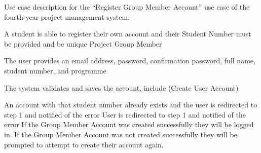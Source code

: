 \documentclass[document.tex]{subfiles}
\begin{document}
\begin{table}
  \centering
  \caption{Use case description for the ``Register Group Member Account'' use case of the fourth-year project management system.}
  \label{tbl:use-case-register-member-account}

  \begin{usecase}
    A student is able to register their own account and their Student Number must be provided and be unique
    Project Group Member
    \ucnormal
    \begin{ucenum}
      \item The user provides an email address, password, confirmation password, full name, student number, and programme
      \item The system validates and saves the account, include (Create User Account)
    \end{ucenum}
    An account with that student number already exists and the user is redirected to step 1 and notified of the error
    User is redirected to step 1 and notified of the error
    If the Group Member Account was created successfully they will be logged in. If the Group Member Account was not created successfully they will be prompted to attempt to create their account again.
  \end{usecase}
\end{table}
\end{document}
